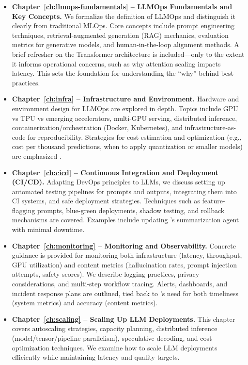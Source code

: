 \begin{itemize}
    \item \textbf{Chapter~\ref{ch:llmops-fundamentals} -- LLMOps Fundamentals and Key Concepts.}  
    We formalize the definition of LLMOps and distinguish it clearly from traditional MLOps. Core concepts include prompt engineering techniques, retrieval-augmented generation (RAG) mechanics, evaluation metrics for generative models, and human-in-the-loop alignment methods. A brief refresher on the Transformer architecture is included---only to the extent it informs operational concerns, such as why attention scaling impacts latency. This sets the foundation for understanding the ``why'' behind best practices.

    \item \textbf{Chapter~\ref{ch:infra} -- Infrastructure and Environment.}  
    Hardware and environment design for LLMOps are explored in depth. Topics include GPU vs TPU vs emerging accelerators, multi-GPU serving, distributed inference, containerization/orchestration (Docker, Kubernetes), and infrastructure-as-code for reproducibility. Strategies for cost estimation and optimization (e.g., cost per thousand predictions, when to apply quantization or smaller models) are emphasized \parencite{bain,fiddler}.

    \item \textbf{Chapter~\ref{ch:cicd} -- Continuous Integration and Deployment (CI/CD).}  
    Adapting DevOps principles to LLMs, we discuss setting up automated testing pipelines for prompts and outputs, integrating them into CI systems, and safe deployment strategies. Techniques such as feature-flagging prompts, blue-green deployments, shadow testing, and rollback mechanisms are covered. Examples include updating \ishtar{}’s summarization agent with minimal downtime.

    \item \textbf{Chapter~\ref{ch:monitoring} -- Monitoring and Observability.}  
    Concrete guidance is provided for monitoring both infrastructure (latency, throughput, GPU utilization) and content metrics (hallucination rates, prompt injection attempts, safety scores). We describe logging practices, privacy considerations, and multi-step workflow tracing. Alerts, dashboards, and incident response plans are outlined, tied back to \ishtar{}'s need for both timeliness (system metrics) and accuracy (content metrics).

    \item \textbf{Chapter~\ref{ch:scaling} -- Scaling Up LLM Deployments.}  
    This chapter covers autoscaling strategies, capacity planning, distributed inference (model/tensor/pipeline parallelism), speculative decoding, and cost optimization techniques. We examine how to scale LLM deployments efficiently while maintaining latency and quality targets.


\end{itemize}
